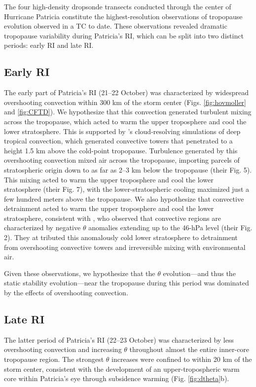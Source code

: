 The four high-density dropsonde transects conducted through the center of Hurricane Patricia constitute the highest-resolution observations of tropopause evolution observed in a TC to date.
These observations revealed dramatic tropopause variability during Patricia’s RI, which can be split into two distinct periods: early RI and late RI.

\subsection{Early RI}

The early part of Patricia’s RI (21--22 October) was characterized by widespread overshooting convection within 300 km of the storm center (Figs. \ref{fig:hovmoller} and \ref{fig:CFTD}).
We hypothesize that this convection generated turbulent mixing across the tropopause, which acted to warm the upper troposphere and cool the lower stratosphere.
This is supported by \citeauthor{RobinsonSherwood2006}'s \citeyear{RobinsonSherwood2006} cloud-resolving simulations of deep tropical convection, which generated convective towers that penetrated to a height 1.5 km above the cold-point tropopause.
Turbulence generated by this overshooting convection mixed air across the tropopause, importing parcels of stratospheric origin down to as far as 2--3 km below the tropopause (their Fig. 5).
This mixing acted to warm the upper troposphere and cool the lower stratosphere (their Fig. 7), with the lower-stratospheric cooling maximized just a few hundred meters above the tropopause.
We also hypothesize that convective detrainment acted to warm the upper troposphere and cool the lower stratosphere, consistent with \cite{Salbyetal2003}, who observed that convective regions are characterized by negative $\theta$ anomalies extending up to the 46-hPa level (their Fig. 2).
They at tributed this anomalously cold lower stratosphere to detrainment from overshooting convective towers and irreversible mixing with environmental air.

Given these observations, we hypothesize that the $\theta$ evolution---and thus the static stability evolution---near the tropopause during this period was dominated by the effects of overshooting convection.

\subsection{Late RI}

The latter period of Patricia’s RI (22--23 October) was characterized by less overshooting convection and increasing $\theta$ throughout almost the entire inner-core tropopause region.
The strongest $\theta$ increases were confined to within 20 km of the storm center, consistent with the development of an upper-tropospheric warm core within Patricia’s eye through subsidence warming (Fig. \ref{fig:dtheta}b).

